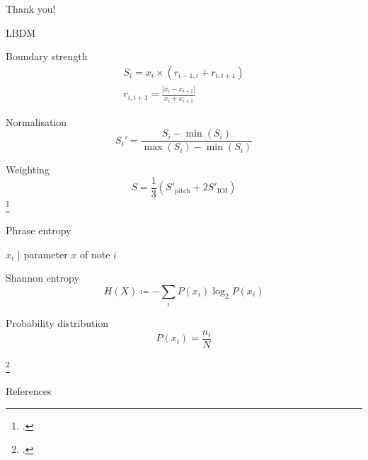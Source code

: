 \documentclass[handout]{beamer}
\begin{document}
\begin{frame}[standout]
    Thank you!
\end{frame}

\appendix

\begin{frame}
    \titlepage
\end{frame}

\begin{frame}{LBDM}

    \begin{block}{Boundary strength}
        \begin{gather*}
            S_i=x_i\times (r_{i-1, i} + r_{i, i+1}) \\
            r_{i, i+1}=\frac{|x_{i}-x_{i+1}|}{x_{i}+x_{i+1}}
        \end{gather*}
    \end{block}
    \begin{block}{Normalisation}
        \begin{equation*}
            S_i'=\frac{S_i-\min(S_i)}{\max(S_i)-\min(S_i)}
        \end{equation*}
    \end{block}
    \begin{block}{Weighting}
        \begin{equation*}
            S=\frac{1}{3}\left( S'_\mathrm{pitch} + 2 S'_\mathrm{IOI} \right)
        \end{equation*}
        \hfill\footcite{cambouropoulos_lbdm_2011}
    \end{block}
    
\end{frame}

\begin{frame}{Phrase entropy}

    $x_i$ | parameter $x$ of note $i$
    \begin{block}{Shannon entropy}
        \begin{equation*}
            H(X)\coloneq-\sum_i P(x_i)\log_2 P(x_i)
        \end{equation*}
    \end{block}
    \begin{block}{Probability distribution}
        \begin{equation*}
            P(x_i)=\frac{n_i}{N}
        \end{equation*}
    \end{block}
    \hfill\footcite{li_automatic_2019}

\end{frame}

\begin{frame}[allowframebreaks]{References}
    \printbibliography[heading=none]
\end{frame}
\end{document}
